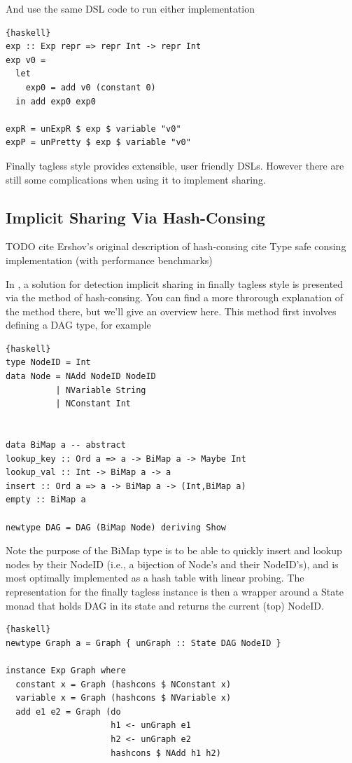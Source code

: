 \documentclass[runningheads]{llncs}
\begin{document}
And use the same DSL code to run either implementation
\begin{lstlisting}{haskell}
exp :: Exp repr => repr Int -> repr Int
exp v0 =
  let
    exp0 = add v0 (constant 0)
  in add exp0 exp0

expR = unExpR $ exp $ variable "v0"
expP = unPretty $ exp $ variable "v0"
\end{lstlisting}

Finally tagless style provides extensible, user friendly DSLs. However there
are still some complications when using it to implement sharing.

\subsection{Implicit Sharing Via Hash-Consing}
TODO
cite Ershov’s original description of hash-consing \cite{ershov1958:consing}
cite Type safe consing implementation (with performance benchmarks) \cite{filliatre:typesafeconsing}

In \cite{kiselyov:sharing}, a solution for detection implicit sharing in finally
tagless style is presented via the method of hash-consing. You can find a more
throrough explanation of the method there, but we'll give an overview here. This
method first involves defining a DAG type, for example
\begin{lstlisting}{haskell}
type NodeID = Int
data Node = NAdd NodeID NodeID
          | NVariable String
          | NConstant Int


data BiMap a -- abstract
lookup_key :: Ord a => a -> BiMap a -> Maybe Int
lookup_val :: Int -> BiMap a -> a
insert :: Ord a => a -> BiMap a -> (Int,BiMap a)
empty :: BiMap a

newtype DAG = DAG (BiMap Node) deriving Show
\end{lstlisting}

Note the purpose of the BiMap type is to be able to quickly insert and lookup
nodes by their NodeID (i.e., a bijection of Node's and their NodeID's), and is
most optimally implemented as a hash table with linear probing. The
representation for the finally tagless instance is then a wrapper around a State
monad that holds DAG in its state and returns the current (top) NodeID.

\begin{lstlisting}{haskell}
newtype Graph a = Graph { unGraph :: State DAG NodeID }

instance Exp Graph where
  constant x = Graph (hashcons $ NConstant x)
  variable x = Graph (hashcons $ NVariable x)
  add e1 e2 = Graph (do
                     h1 <- unGraph e1
                     h2 <- unGraph e2
                     hashcons $ NAdd h1 h2)
\end{lstlisting}
\end{document}
